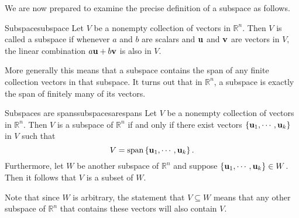 We are now prepared to examine the precise definition of a subspace as follows.

\begin{definition}{Subspace}{subspace}
Let $V$ be a nonempty collection of vectors in $\mathbb{R}^{n}.$ Then
$V$ is called a subspace if whenever $a$ and $b$  are scalars and ${\bf u}$ and ${\bf v}$
are vectors in $V,$ the linear combination $a {\bf u}+ b {\bf v}$ is also in $V$.
\end{definition}

More generally this means that a subspace contains the span of any
finite collection vectors in that subspace. It turns out that in
$\mathbb{R}^{n}$, a subspace is exactly the span of finitely many of
its vectors.

\begin{theorem}{Subspaces are spans}{subspacesarespans}
Let $V$ be a nonempty collection of vectors in $\mathbb{R}^{n}.$ Then $V$ is a subspace of $\mathbb{R}^{n}$ if and only if there
exist vectors $\left\{ {\bf u}_{1},\cdots ,{\bf u}_{k}\right\}$ in $V$ such that 
\[
V= \mbox{span}\left\{ {\bf u}_{1},\cdots ,{\bf u}_{k}\right\}. 
\]
Furthermore, let $W$ be another subspace of $\mathbb{R}^n$ and suppose $\left\{ {\bf u}_{1},\cdots ,{\bf u}_{k}\right\} \in W$. Then it follows that $V$ is a subset of $W$. 
\end{theorem}

Note that since $W$ is arbitrary, the statement that $V \subseteq W$ means that any other subspace of $\mathbb{R}^n$ that contains these vectors will also contain $V$. 

